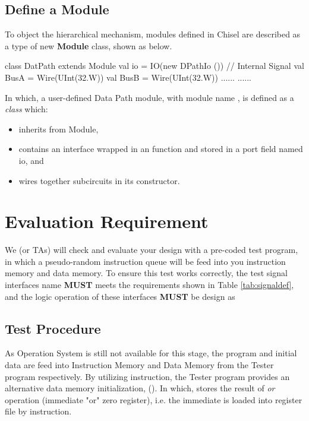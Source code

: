 \documentclass[a4paper]{article}
\begin{document}
\subsection{Define a Module} \label{sub:module}
To object the hierarchical mechanism, modules defined in Chisel are described as a type of new \textbf{Module} class, shown as below.
\begin{scala}
class DatPath extends Module {
	val io = IO(new DPathIo ())
	// Internal Signal
	val BusA 	= Wire(UInt(32.W))
	val BusB 	= Wire(UInt(32.W))
	......
	......
}
\end{scala}
In which, a user-defined Data Path module, with module name , is defined as a \textit{class} which:
\begin{itemize}
	\item inherits from Module,
	\item contains an interface wrapped in an  function and stored in a port field named io, and
	\item wires together subcircuits in its constructor.
\end{itemize}


\newpage
\section{Evaluation Requirement} \label{sec:Functions}%
We (or TAs) will check and evaluate your design with a pre-coded test program, in which a pseudo-random instruction queue will be feed into you instruction memory and data memory. To ensure this test works correctly, the test signal interfaces name \textbf{MUST} meets the requirements shown in Table \ref{tab:signaldef}, and the logic operation of these interfaces \textbf{MUST} be design as
\subsection{Test Procedure}\label{sub:TestProc}
As Operation System is still not available for this stage, the program and initial data are feed into Instruction Memory and Data Memory from the Tester program respectively. By utilizing  instruction, the Tester program provides an alternative data memory initialization,  (). In which,  stores the result of \textit{or} operation (immediate "or" zero register), i.e. the immediate is loaded into register file by  instruction.
\end{document}
